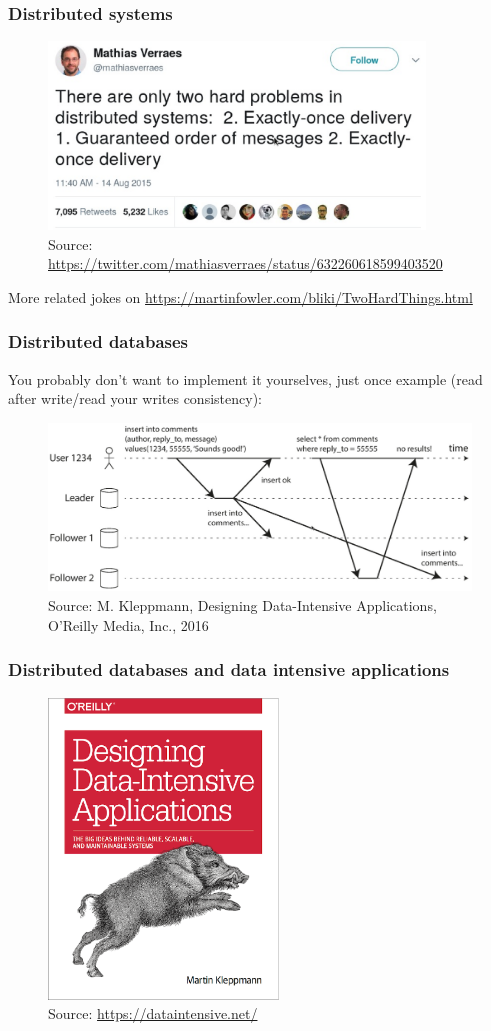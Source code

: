 \documentclass[10pt,utf8]{beamer}
\begin{document}
\begin{frame}
	\frametitle{Distributed systems}
	\begin{figure}
		\centering
		\includegraphics[width=10cm]{./img/two_hard_things.eps}
		\caption{\tiny{Source: \url{https://twitter.com/mathiasverraes/status/632260618599403520}}}
	\end{figure}
	More related jokes on \color{blue}\url{https://martinfowler.com/bliki/TwoHardThings.html}\color{black}
\end{frame}

\begin{frame}
	\frametitle{Distributed databases}
	You probably don't want to implement it yourselves, just once example (read after write/read your writes consistency):
	\begin{figure}
		\centering
		\includegraphics[width=12cm]{./img/read-after-write-consistency.eps}
		\caption{\tiny{Source: M. Kleppmann, Designing Data-Intensive Applications, O'Reilly Media, Inc., 2016}}
	\end{figure}
\end{frame}

\begin{frame}
	\frametitle{Distributed databases and data intensive applications}
	\begin{figure}
		\centering
		\includegraphics[height=8cm]{./img/ddia.eps}
		\caption{\tiny{Source: \url{https://dataintensive.net/}}}
	\end{figure}
\end{frame}
\end{document}
